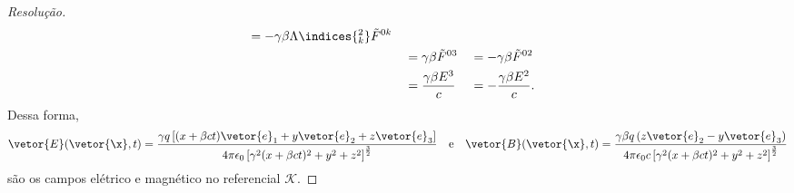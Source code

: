 \begin{proof}[Resolução]
\begin{align*}
          &= -\gamma\beta \Lambda\indices{^2_k} \tilde{F}^{0k}\\
          &&
          &= \gamma\beta \tilde{F}^{03}&
          &= - \gamma\beta \tilde{F}^{02}\\
          &&
          &= \frac{\gamma \beta E^3}{c}&
          &= - \frac{\gamma \beta E^2}{c}.
   \end{align*}
   Dessa forma, 
   \begin{equation*}
      \vetor{E}(\vetor{\x}, t) = \frac{\gamma q \left[(x + \beta ct)\vetor{e}_1 + y\vetor{e}_2 + z\vetor{e}_3\right]}{4\pi \epsilon_0 \left[\gamma^2 (x + \beta ct)^2 + y^2 + z^2\right]^{\frac32}}
      \quad\text{e}\quad
      \vetor{B}(\vetor{\x}, t) = \frac{\gamma \beta q \left(z\vetor{e}_2 - y\vetor{e}_3\right)}{4\pi \epsilon_0 c\left[\gamma^2 (x + \beta ct)^2 + y^2 + z^2\right]^{\frac32}}
   \end{equation*}
   são os campos elétrico e magnético no referencial \(\mathscr{K}.\)
\end{proof}
